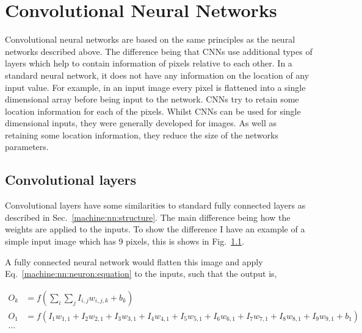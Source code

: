\section{Convolutional Neural Networks}

Convolutional neural networks are based on the same principles as the neural networks described above. 
The difference being that \acp{CNN} use additional types of layers which help to contain information of pixels relative to each other.
In a standard neural network, it does not have any information on the location of any input value.
For example, in an input image every pixel is flattened into a single dimensional array before being input to the network.
\acp{CNN} try to retain some location information for each of the pixels.
Whilst \acp{CNN} can be used for single dimensional inputs, they were generally developed for images.
As well as retaining some location information, they reduce the size of the networks parameters.


\subsection{Convolutional layers}

Convolutional layers have some similarities to standard fully connected layers as described in Sec.~\ref{machine:nn:structure}. 
The main difference being how the weights are applied to the inputs.
To show the difference I have an example of a simple input image which has 9 pixels, this is shows in Fig.~\ref{}.

A fully connected neural network would flatten this image and apply Eq.~\ref{machine:nn:neuron:equation} to the inputs, such that the output is,

\begin{equation}
\begin{split}
    O_{k} &= f\left(\sum_{i} \sum_{j} I_{i,j} w_{i,j,k} + b_k \right) \\
    O_1 &= f\left(I_1 w_{1,1} + I_2 w_{2,1} + I_3 w_{3,1} + I_4 w_{4,1} + I_5 w_{5,1} + I_6 w_{6,1} + I_7 w_{7,1} + I_8 w_{8,1} + I_9 w_{9,1} + b_1\right) \\
     \dots
\end{split}
\end{equation}

